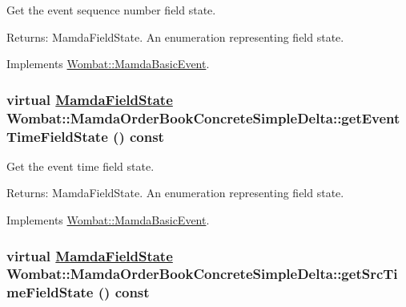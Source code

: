 Get the event sequence number field state. 

\begin{Desc}
\item[Returns:]Mamda\-Field\-State. An enumeration representing field state. \end{Desc}


Implements \hyperlink{classWombat_1_1MamdaBasicEvent_51cc0b9d4c2b8a982ccd18b339707cb5}{Wombat::Mamda\-Basic\-Event}.\hypertarget{classWombat_1_1MamdaOrderBookConcreteSimpleDelta_00da14e2c14ad95ab8484bce70ba6536}{
\subsubsection[getEventTimeFieldState]{\setlength{\rightskip}{0pt plus 5cm}virtual \hyperlink{namespaceWombat_93aac974f2ab713554fd12a1fa3b7d2a}{Mamda\-Field\-State} Wombat::Mamda\-Order\-Book\-Concrete\-Simple\-Delta::get\-Event\-Time\-Field\-State () const}}
\label{classWombat_1_1MamdaOrderBookConcreteSimpleDelta_00da14e2c14ad95ab8484bce70ba6536}


Get the event time field state. 

\begin{Desc}
\item[Returns:]Mamda\-Field\-State. An enumeration representing field state. \end{Desc}


Implements \hyperlink{classWombat_1_1MamdaBasicEvent_ff3932065e16e660fb6cd9285b46f7d0}{Wombat::Mamda\-Basic\-Event}.\hypertarget{classWombat_1_1MamdaOrderBookConcreteSimpleDelta_f5679fbd65c7406cc4e6b905460a5159}{
\subsubsection[getSrcTimeFieldState]{\setlength{\rightskip}{0pt plus 5cm}virtual \hyperlink{namespaceWombat_93aac974f2ab713554fd12a1fa3b7d2a}{Mamda\-Field\-State} Wombat::Mamda\-Order\-Book\-Concrete\-Simple\-Delta::get\-Src\-Time\-Field\-State () const}}
\label{classWombat_1_1MamdaOrderBookConcreteSimpleDelta_f5679fbd65c7406cc4e6b905460a5159}


